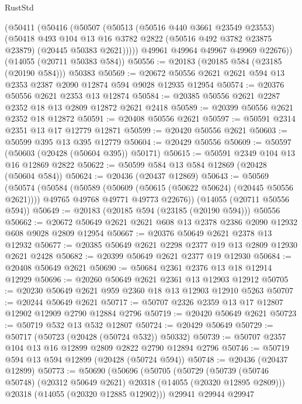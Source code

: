 \begin{lexlean}{RustStd}
\begin{coremodule}
      (@50411
        (@50416
          (@50507
            (@50513
              (@50516 @440 @3661 @23549 @23553)
              (@50418
                @493
                @104
                @13
                @16
                @3782
                @2822
                (@50516 @492 @3782 @23875 @23879)
                (@20445 @50383 @2621)))))
        @49961
        @49964
        @49967
        @49969
        @22676))
    (@14055 (@20711 @50383 @584))
@50556 := @20183 (@20185 @584 (@23185 (@20190 @584))) @50383
@50569 := @20672 @50556 @2621 @2621 @594 @13 @2353 @2387 @2090 @12874 @594 @9028 @12935 @12954
@50574 := @20376 @50556 @2621 @2353 @13 @12874
@50584 := @20385 @50556 @2621 @2287 @2352 @18 @13 @2809 @12872 @2621 @2418
@50589 := @20399 @50556 @2621 @2352 @18 @12872
@50591 := @20408 @50556 @2621
@50597 := @50591 @2314 @2351 @13 @17 @12779 @12871
@50599 := @20420 @50556 @2621
@50603 := @50599 @395 @13 @395 @12779
@50604 := @20429 @50556
@50609 := @50597 (@50603 (@20428 (@50604 @395)) @50171)
@50615 := @50591 @2349 @104 @13 @16 @12869 @2822
@50622 := @50599 @584 @13 @584 @12869 (@20428 (@50604 @584))
@50624 := @20436 (@20437 @12869)
@50643 := @50569
    (@50574
      (@50584
        (@50589 (@50609 (@50615 (@50622 @50624) (@20445 @50556 @2621))))
        @49765
        @49768
        @49771
        @49773
        @22676))
    (@14055 (@20711 @50556 @594))
@50649 := @20183 (@20185 @594 (@23185 (@20190 @594))) @50556
@50662 := @20672 @50649 @2621 @2621 @608 @13 @2378 @2386 @2090 @12932 @608 @9028 @2809 @12954
@50667 := @20376 @50649 @2621 @2378 @13 @12932
@50677 := @20385 @50649 @2621 @2298 @2377 @19 @13 @2809 @12930 @2621 @2428
@50682 := @20399 @50649 @2621 @2377 @19 @12930
@50684 := @20408 @50649 @2621
@50690 := @50684 @2361 @2376 @13 @18 @12914 @12929
@50696 := @20260 @50649 @2621 @2361 @13 @12903 @12912
@50705 := @20230 @50649 @2621 @959 @2360 @18 @13 @12903 @12910 @5263
@50707 := @20244 @50649 @2621
@50717 := @50707 @2326 @2359 @13 @17 @12807 @12902 @12909 @2790 @12884 @2796
@50719 := @20420 @50649 @2621
@50723 := @50719 @532 @13 @532 @12807
@50724 := @20429 @50649
@50729 := @50717 (@50723 (@20428 (@50724 @532)) @50332)
@50739 := @50707 @2357 @104 @13 @16 @12899 @2809 @2822 @2790 @12894 @2796
@50746 := @50719 @594 @13 @594 @12899 (@20428 (@50724 @594))
@50748 := @20436 (@20437 @12899)
@50773 := @50690
    (@50696
      (@50705
        (@50729
          (@50739 (@50746 @50748) (@20312 @50649 @2621) @20318 (@14055 (@20320 @12895 @2809)))
          @20318
          (@14055 (@20320 @12885 @12902)))
        @29941
        @29944
        @29947

\end{coremodule}
\end{lexlean}
